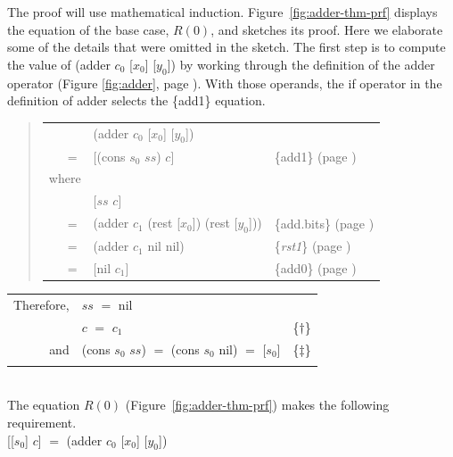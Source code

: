 The proof will use mathematical induction.
Figure~\ref{fig:adder-thm-prf}
displays the equation of the base case, $R(0)$,
and sketches its proof. Here we elaborate some of the details
that were omitted in the sketch.
The first step is
to compute the value of \textsf{(adder $c_0$ [$x_0$] [$y_0$])}
by working through the definition of the \textsf{adder} operator
(Figure \ref{fig:adder}, page \pageref{fig:adder}).
With those operands, the \textsf{if} operator in
the definition of \textsf{adder} selects the \{add1\} equation.
\begin{quote}
\begin{tabular}{rll}
       & \textsf{(adder $c_0$ [$x_0$] [$y_0$])}              & \\
\vspace{1mm}
$=$    & \textsf{[(cons $s_0$ $ss$) $c$]}                    & \{add1\} (page \pageref {fig:adder})  \\
where  &&\\
       & \textsf{[$ss$  $c$]}                                & \\
$=$    & \textsf{(adder $c_1$ (rest [$x_0$]) (rest [$y_0$]))}& \{add.bits\} (page \pageref {fig:adder}) \\
$=$    & \textsf{(adder $c_1$ nil nil)}                      & \{\emph{rst1}\} (page \pageref {rst1}) \\
$=$    & \textsf{[nil  $c_1$]}                               & \{add0\} (page \pageref {fig:adder}) \\
\end{tabular}
\end{quote}
\addtolength{\tabcolsep}{-1mm}
\begin{tabular}{rll}
Therefore, & $ss$ $=$ \textsf{nil}                                       & \\
           & $c$ $=$ $c_1$                                      & \{$\dagger$\} \\
and        & \textsf{(cons $s_0$ $ss$}) $=$ \textsf{(cons $s_0$ nil)} $=$ \textsf{[$s_0$]} & \{$\ddagger$\}\\
           &                                                    & \\
\end{tabular}\\
\addtolength{\tabcolsep}{1mm}
The equation $R(0)$ (Figure~\ref{fig:adder-thm-prf}) makes the following requirement.
\vspace{1mm}\\
\hspace*{1.5cm}\textsf{[[$s_0$] $c$]} $=$ \textsf{(adder $c_0$ [$x_0$] [$y_0$])}
